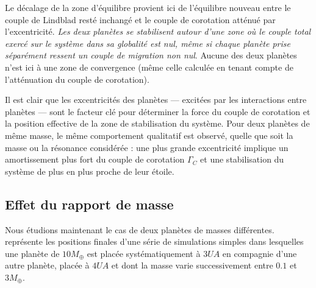 Le décalage de la zone d'équilibre provient ici de l'équilibre nouveau entre le couple de Lindblad resté inchangé et le couple de corotation atténué par l'excentricité. \emph{Les deux planètes se stabilisent autour d'une zone où le couple total exercé sur le système dans sa globalité est nul, même si chaque planète prise séparément ressent un couple de migration non nul}. Aucune des deux planètes n'est ici à une zone de convergence (même celle calculée en tenant compte de l'atténuation du couple de corotation). 

Il est clair que les excentricités des planètes --- excitées par les interactions entre planètes --- sont le facteur clé pour déterminer la force du couple de corotation et la position effective de la zone de stabilisation du système. Pour deux planètes de même masse, le même comportement qualitatif est observé, quelle que soit la masse ou la résonance considérée : une plus grande excentricité implique un amortissement plus fort du couple de corotation $\Gamma_C$ et une stabilisation du système de plus en plus proche de leur étoile. 

\subsection{Effet du rapport de masse}\label{sec:mass-ratio-effect}
Nous étudions maintenant le cas de deux planètes de masses différentes.  représente les
positions finales d'une série de simulations simples dans lesquelles une planète de $10\unit{M_\oplus}$ est placée
systématiquement à $3\unit{UA}$ en compagnie d'une autre planète, placée à $4\unit{UA}$ et dont la masse varie successivement
entre $0.1$ et $3\unit{M_\oplus}$. 

